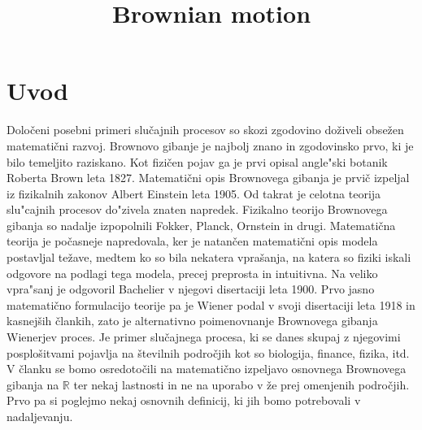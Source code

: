 \documentclass[twoside,11pt]{article}
\begin{document}



\klasifikacija{~} 
\title{Brownian motion}

\glava\baselineskip=14.5pt

\smallskip

\section{Uvod}

Določeni posebni primeri slučajnih procesov so skozi zgodovino doživeli obsežen
matematični razvoj. Brownovo gibanje je najbolj znano in zgodovinsko prvo, ki je bilo 
temeljito raziskano. Kot fizičen pojav ga je prvi opisal angle"ski botanik Roberta Brown leta 1827.
Matematični opis Brownovega gibanja je prvič izpeljal iz fizikalnih zakonov Albert
Einstein leta 1905. Od takrat je celotna teorija slu"cajnih procesov do"zivela znaten napredek. Fizikalno teorijo Brownovega gibanja
so nadalje izpopolnili Fokker, Planck, Ornstein in drugi. Matematična 
teorija je počasneje napredovala, ker je natančen matematični opis modela postavljal 
težave, medtem ko so bila nekatera vprašanja, na katera so fiziki iskali odgovore na
podlagi tega modela, precej preprosta in intuitivna. Na veliko vpra"sanj je odgovoril Bachelier
v njegovi disertaciji leta 1900.
Prvo jasno matematično formulacijo teorije pa je Wiener podal v svoji
disertaciji leta 1918 in kasnejših člankih, zato je alternativno poimenovnanje 
Brownovega gibanja Wienerjev proces. Je primer slučajnega procesa, ki se danes skupaj z 
njegovimi posplošitvami pojavlja na številnih področjih kot so biologija, finance, fizika,
itd. V članku se bomo osredotočili na matematično izpeljavo osnovnega Brownovega gibanja 
na $\mathbb{R}$ ter nekaj lastnosti in ne na uporabo v že prej omenjenih področjih.
Prvo pa si poglejmo nekaj osnovnih definicij, ki jih bomo potrebovali v nadaljevanju.
\end{document}

